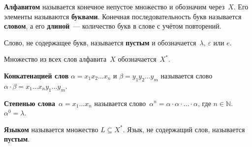  \textbf{Алфавитом} называется конечное непустое множество и обозначим через~$X$.
 Его элементы называются \textbf{буквами}.
 Конечная последовательность букв называется \textbf{словом}, а его \textbf{длиной}~--- количество букв в слове с учётом повторений.

Слово, не содержащее букв, называется \textbf{пустым} и обозначается~$\lambda$, $\varepsilon$ или $e$.

Множество из всех слов алфавита~$X$ обозначается~$X^*$.

 \textbf{Конкатенацией слов} $\alpha = x_1 x_2 \ldots x_n$ и $\beta = y_1 y_2 \ldots y_m$ называется слово $\alpha \cdot \beta = x_1 \ldots x_n y_1 \ldots y_m$.

 \textbf{Степенью слова}~$\alpha = x_1 \ldots x_n$ называется слово~$\alpha^n = \alpha \cdot \alpha \cdot \ldots \cdot \alpha$, где $n \in \mathbb N$.
$\alpha^0 = \lambda$.

 \textbf{Языком} называется множество $L \subseteq X^*$.
Язык, не содержащий слов, называется \textbf{пустым}.